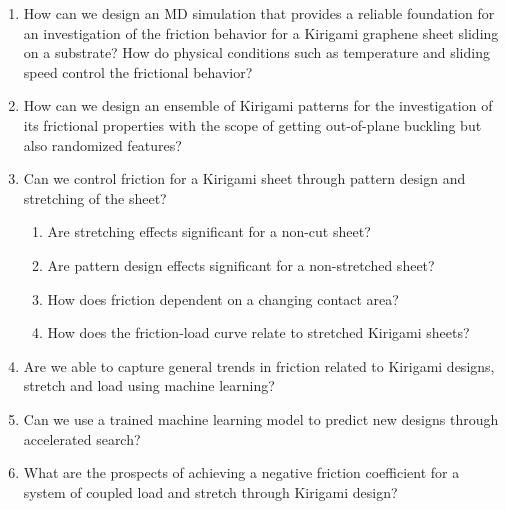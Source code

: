 \begin{enumerate}
  \item  How can we design an \acrshort{MD} simulation that provides a reliable foundation for an investigation of the friction behavior for a Kirigami graphene sheet sliding on a substrate? How do physical conditions such as temperature and sliding speed control the frictional behavior?
  \item How can we design an ensemble of Kirigami patterns for the investigation of its frictional properties with the scope of getting out-of-plane buckling but also randomized features?   
  \item Can we control friction for a Kirigami sheet through pattern design and stretching of the sheet?
  \begin{enumerate}
    \item Are stretching effects significant for a non-cut sheet?
    \item Are pattern design effects significant for a non-stretched sheet?
    \item How does friction dependent on a changing contact area?
    \item How does the friction-load curve relate to stretched Kirigami sheets?
  \end{enumerate}
  \item Are we able to capture general trends in friction related to Kirigami designs, stretch and load using machine learning?
  \item Can we use a trained machine learning model to predict new designs through accelerated search?
  \item What are the prospects of achieving a negative friction coefficient for a system of coupled load and stretch through Kirigami design?
\end{enumerate}



